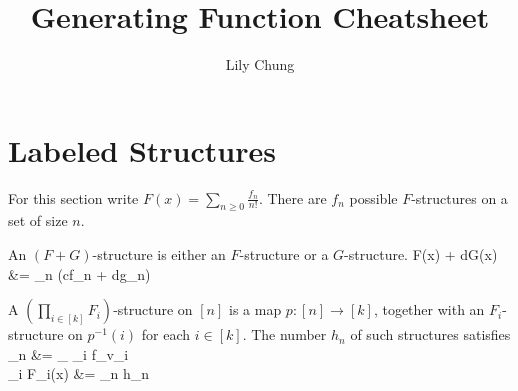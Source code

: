 \documentclass[11pt,a4paper]{article}
\title{Generating Function Cheatsheet}
\author{
  Lily Chung
}
\date{}
\newcommand*{\N}[0]{\mathbb{N}}
\def\[#1\]{\begin{align*}#1\end{align*}}
\begin{document}
\maketitle

\begin{comment}
  \section*{Unlabeled Prefabs}

  For this section write $A(x) = \sum_{n \ge 0} a_n x^n$.  There are $f_n$ possible prefabs of size $n$.

  An $(A + B)$-prefab is either an $A$-prefab or a $B$-prefab.
  \[cA(x) + dB(x) &= \sum_{n \ge 0} (ca_n + db_n)x^n\]

  A $(\prod_{i \in [k]} A_i)$-prefab of size $n$ consists of an $A_i$-prefab for each $i$, with total size $n$.
  The number $h_n$ of such prefabs satisfies
  \[
  h_n &= \sum_{\substack{v \in \N^k \\ \sum_i v_i = n}} \prod_{i \in [k]} a_{v_i} \\
  \prod_{i \in [k]} A_i(x) &= \sum_{n \ge 0} h_n x^n
  \]

  Assume $B(0) = 0$.  An $(A \circ B)$-prefab of size $n$ consists of a $k$-part composition of $n$, an $A$-prefab of size $k$, and a $B$-prefab of each size in the composition.  The number $r_n$ of such prefabs satisfies
  \[
  r_n &= \sum_k \sum_{\substack{v \in \N_+^k \\ \sum_i v_i = n}} a_k \prod_{i \in [k]} b_{v_i}
  \]
\end{comment}

\section*{Labeled Structures}

For this section write $F(x) = \sum_{n \ge 0} \frac{f_n}{n!}$.
There are $f_n$ possible $F$-structures on a set of size $n$.

An $(F + G)$-structure is either an $F$-structure or a $G$-structure.
\[
cF(x) + dG(x) &= \sum_{n } (cf_n + dg_n)
\]

A $(\prod_{i \in [k]} F_i)$-structure on $[n]$ is a map $p : [n] \to [k]$, together with an $F_i$-structure on $p^{-1}(i)$ for each $i \in [k]$.  The number $h_n$ of such structures satisfies
\[h_n &= \sum_{\substack{v \in \N^k \\ \sum_i v_i = n}}  \prod_{i \in [k]} f_{v_i} \\
\prod_{i \in [k]} F_i(x) &= \sum_{n } h_n 
\]
\end{document}
